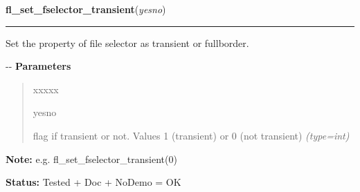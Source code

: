 \hspace{.8\funcindent}\begin{boxedminipage}{\funcwidth}

    \raggedright \textbf{fl\_set\_fselector\_transient}(\textit{yesno})

    \vspace{-1.5ex}

    \rule{\textwidth}{0.5\fboxrule}
\setlength{\parskip}{2ex}

Set the property of file selector as transient or fullborder.

-{}-
\setlength{\parskip}{1ex}
      \textbf{Parameters}
      \vspace{-1ex}

      \begin{quote}
        \begin{Ventry}{xxxxx}

          \item[yesno]


flag if transient or not. Values 1 (transient) or 0 (not transient)
            {\it (type=int)}

        \end{Ventry}

      \end{quote}

\textbf{Note:} 
e.g. fl\_set\_fselector\_transient(0)


\textbf{Status:} 
Tested + Doc + NoDemo = OK


    \end{boxedminipage}

    \label{xformslib:flgoodies:fl_set_fselector_callback}

    \vspace{0.5ex}

